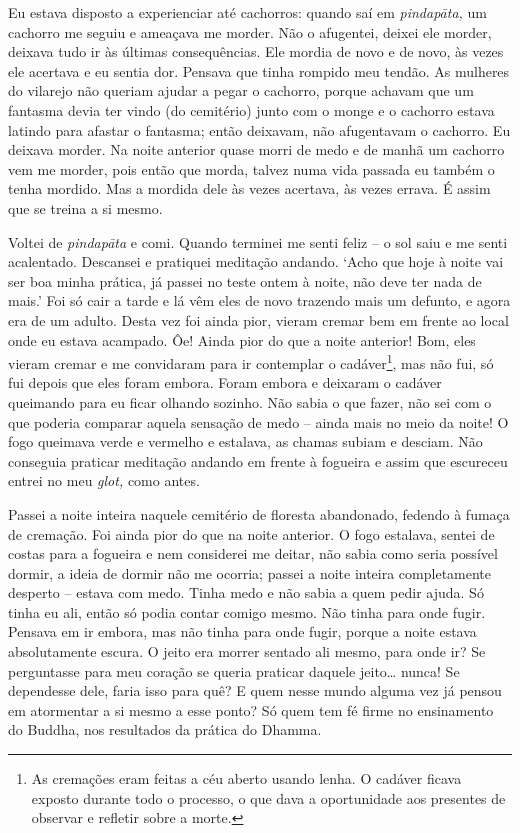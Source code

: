 Eu estava disposto a experienciar até cachorros: quando saí em
\emph{pindapāta,} um cachorro me seguiu e ameaçava me morder. Não o
afugentei, deixei ele morder, deixava tudo ir às últimas consequências.
Ele mordia de novo e de novo, às vezes ele acertava e eu sentia dor.
Pensava que tinha rompido meu tendão. As mulheres do vilarejo não
queriam ajudar a pegar o cachorro, porque achavam que um fantasma devia
ter vindo (do cemitério) junto com o monge e o cachorro estava latindo
para afastar o fantasma; então deixavam, não afugentavam o cachorro. Eu
deixava morder. Na noite anterior quase morri de medo e de manhã um
cachorro vem me morder, pois então que morda, talvez numa vida passada
eu também o tenha mordido. Mas a mordida dele às vezes acertava, às
vezes errava. É assim que se treina a si mesmo.

Voltei de \emph{pindapāta} e comi. Quando terminei me senti feliz -- o
sol saiu e me senti acalentado. Descansei e pratiquei meditação andando.
`Acho que hoje à noite vai ser boa minha prática, já passei no teste
ontem à noite, não deve ter nada de mais.' Foi só cair a tarde e lá vêm
eles de novo trazendo mais um defunto, e agora era de um adulto. Desta
vez foi ainda pior, vieram cremar bem em frente ao local onde eu estava
acampado. Ôe! Ainda pior do que a noite anterior! Bom, eles vieram
cremar e me convidaram para ir contemplar o cadáver\footnote{As
  cremações eram feitas a céu aberto usando lenha. O cadáver ficava
  exposto durante todo o processo, o que dava a oportunidade aos
  presentes de observar e refletir sobre a morte.}, mas não fui, só fui
depois que eles foram embora. Foram embora e deixaram o cadáver
queimando para eu ficar olhando sozinho. Não sabia o que fazer, não sei
com o que poderia comparar aquela sensação de medo -- ainda mais no meio
da noite! O fogo queimava verde e vermelho e estalava, as chamas subiam
e desciam. Não conseguia praticar meditação andando em frente à fogueira
e assim que escureceu entrei no meu \emph{glot,} como antes.

Passei a noite inteira naquele cemitério de floresta abandonado, fedendo
à fumaça de cremação. Foi ainda pior do que na noite anterior. O fogo
estalava, sentei de costas para a fogueira e nem considerei me deitar,
não sabia como seria possível dormir, a ideia de dormir não me ocorria;
passei a noite inteira completamente desperto -- estava com medo. Tinha
medo e não sabia a quem pedir ajuda. Só tinha eu ali, então só podia
contar comigo mesmo. Não tinha para onde fugir. Pensava em ir embora,
mas não tinha para onde fugir, porque a noite estava absolutamente
escura. O jeito era morrer sentado ali mesmo, para onde ir? Se
perguntasse para meu coração se queria praticar daquele jeito\ldots{}
nunca! Se dependesse dele, faria isso para quê? E quem nesse mundo
alguma vez já pensou em atormentar a si mesmo a esse ponto? Só quem tem
fé firme no ensinamento do Buddha, nos resultados da prática do Dhamma.

